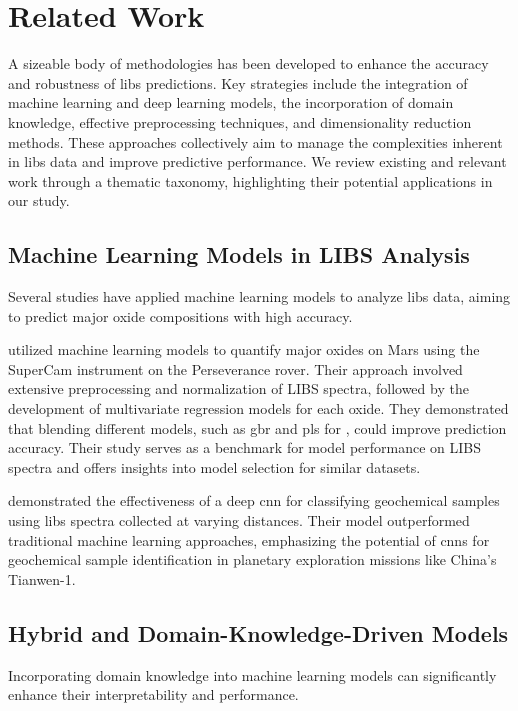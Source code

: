 \section{Related Work}
A sizeable body of methodologies has been developed to enhance the accuracy and robustness of \gls{libs} predictions.
Key strategies include the integration of machine learning and deep learning models, the incorporation of domain knowledge, effective preprocessing techniques, and dimensionality reduction methods.
These approaches collectively aim to manage the complexities inherent in \gls{libs} data and improve predictive performance.
We review existing and relevant work through a thematic taxonomy, highlighting their potential applications in our study.

\subsection{Machine Learning Models in LIBS Analysis}
Several studies have applied machine learning models to analyze \gls{libs} data, aiming to predict major oxide compositions with high accuracy.

\citet{andersonPostlandingMajorElement2022} utilized machine learning models to quantify major oxides on Mars using the SuperCam instrument on the Perseverance rover.
Their approach involved extensive preprocessing and normalization of LIBS spectra, followed by the development of multivariate regression models for each oxide.
They demonstrated that blending different models, such as \gls{gbr} and \gls{pls} for , could improve prediction accuracy.
Their study serves as a benchmark for model performance on LIBS spectra and offers insights into model selection for similar datasets.

\citet{yangConvolutionalNeuralNetwork2022} demonstrated the effectiveness of a deep \gls{cnn} for classifying geochemical samples using \gls{libs} spectra collected at varying distances.
Their model outperformed traditional machine learning approaches, emphasizing the potential of \gls{cnn}s for geochemical sample identification in planetary exploration missions like China's Tianwen-1.

\subsection{Hybrid and Domain-Knowledge-Driven Models}
Incorporating domain knowledge into machine learning models can significantly enhance their interpretability and performance.


